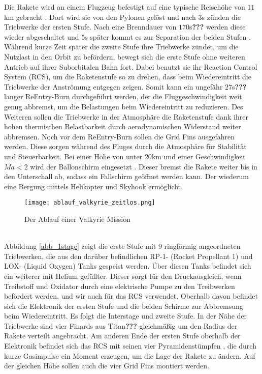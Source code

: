 Die Rakete wird an einem Flugzeug befestigt auf eine typische Reisehöhe von $11$km gebracht \cite{flugbahnBarz}. Dort wird sie von den Pylonen gelöst und nach $3$s zünden die Triebwerke der ersten Stufe. Nach eine Brenndauer von $170$s\textbf{???} werden diese wieder abgeschaltet und $5$s später kommt es zur Separation der beiden Stufen \cite{flugbahnBarz}. Während kurze Zeit später die zweite Stufe ihre Triebwerke zündet, um die Nutzlast in den Orbit zu befördern, bewegt sich die erste Stufe ohne weiteren Antrieb auf ihrer Suborbitalen Bahn fort. Dabei benutzt sie ihr Reaction Control System (RCS), um die Raketenstufe so zu drehen, dass beim Wiedereintritt die Triebwerke der Anströmung entgegen zeigen. Somit kann ein ungefähr $27$s\textbf{???} langer ReEntry-Burn durchgeführt werden, der die Fluggeschwindigkeit weit genug abbremst, um die Belastungen beim Wiedereintritt zu reduzieren. Des Weiteren sollen die Triebwerke in der Atmosphäre die Raketenstufe dank ihrer hohen thermischen Belastbarkeit durch aerodynamischen Widerstand weiter abbremsen. Noch vor dem ReEntry-Burn sollen die Grid Fins ausgefahren werden. Diese sorgen während des Fluges durch die Atmosphäre für Stabilität und Steuerbarkeit. Bei einer Höhe von unter $20$km und einer Geschwindigkeit $Ma<2$ wird der Ballonschirm eingesetzt \cite{flugbahnBarz}. Dieser bremst die Rakete weiter bis in den Unterschall ab, sodass ein Fallschirm geöffnet werden kann. Der wiederum eine Bergung mittels Helikopter und Skyhook ermöglicht.
\begin{figure}[h]
	\centering
	\texttt{[image: ablauf\_valkyrie\_zeitlos.png]}
	\caption{Der Ablauf einer Valkyrie Mission}
	\label{abb_valkMission}
\end{figure}\\
Abbildung \ref{abb_1stage} zeigt die erste Stufe mit $9$ ringförmig angeordneten Triebwerken, die aus den darüber befindlichen RP-1- (Rocket Propellant 1) und LOX- (Liquid Oxygen) Tanks gespeist werden. Über diesen Tanks befindet sich ein weiterer mit Helium gefüllter. Dieser sorgt für den Druckausgleich, wenn Treibstoff und Oxidator durch eine elektrische Pumpe zu den Treibwerken befördert werden, und wir auch für das RCS verwendet. Oberhalb davon befindet sich die Elektronik der ersten Stufe und die beiden Schirme zur Abbremsung beim Wiedereintritt. Es folgt die Interstage und zweite Stufe.
In der Nähe der Triebwerke sind vier Finards aus Titan\textbf{???} gleichmäßig um den Radius der Rakete verteilt angebracht. Am anderen Ende der ersten Stufe oberhalb der Elektronik befindet sich das RCS mit seinen vier Pyramidenstümpfen \cite{flugbahnBarz}, die durch kurze Gasimpulse ein Moment erzeugen, um die Lage der Rakete zu ändern. Auf der gleichen Höhe sollen auch die vier Grid Fins montiert werden.

